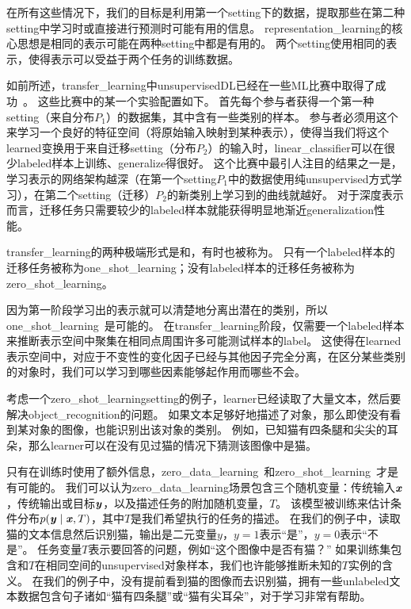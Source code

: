 在所有这些情况下，我们的目标是利用第一个\gls{setting}下的数据，提取那些在第二种\gls{setting}中学习时或直接进行预测时可能有用的信息。
\gls{representation_learning}的核心思想是相同的表示可能在两种\gls{setting}中都是有用的。
两个\gls{setting}使用相同的表示，使得表示可以受益于两个任务的训练数据。

如前所述，\gls{transfer_learning}中\gls{unsupervised}\gls{DL}已经在一些\gls{ML}比赛中取得了成功~\citep{UTLC+LISA-2011-small,goodfellow+all-NIPS2011}。
这些比赛中的某一个实验配置如下。
首先每个参与者获得一个第一种\gls{setting}（来自分布$P_1$）的数据集，其中含有一些类别的样本。
参与者必须用这个来学习一个良好的特征空间（将原始输入映射到某种表示），使得当我们将这个\gls{learned}变换用于来自迁移\gls{setting}（分布$P_2$）的输入时，\gls{linear_classifier}可以在很少\gls{labeled}样本上训练、\gls{generalize}得很好。
这个比赛中最引人注目的结果之一是，学习表示的网络架构越深（在第一个\gls{setting}$P_1$中的数据使用纯\gls{unsupervised}方式学习），在第二个\gls{setting}（迁移）$P_2$的新类别上学习到的曲线就越好。
对于深度表示而言，迁移任务只需要较少的\gls{labeled}样本就能获得明显地渐近\gls{generalization}性能。


\gls{transfer_learning}的两种极端形式是和，有时也被称为。
只有一个\gls{labeled}样本的迁移任务被称为\gls{one_shot_learning}；没有\gls{labeled}样本的迁移任务被称为\gls{zero_shot_learning}。

因为第一阶段学习出的表示就可以清楚地分离出潜在的类别，所以\gls{one_shot_learning}~\citep{Fei-Fei+al-2006}是可能的。
在\gls{transfer_learning}阶段，仅需要一个\gls{labeled}样本来推断表示空间中聚集在相同点周围许多可能测试样本的\gls{label}。
这使得在\gls{learned}表示空间中，对应于不变性的变化因子已经与其他因子完全分离，在区分某些类别的对象时，我们可以学习到哪些因素能够起作用而哪些不会。


考虑一个\gls{zero_shot_learning}\gls{setting}的例子，\gls{learner}已经读取了大量文本，然后要解决\gls{object_recognition}的问题。
如果文本足够好地描述了对象，那么即使没有看到某对象的图像，也能识别出该对象的类别。
例如，已知猫有四条腿和尖尖的耳朵，那么\gls{learner}可以在没有见过猫的情况下猜测该图像中是猫。


只有在训练时使用了额外信息，\gls{zero_data_learning}~\citep{Larochelle2008}和\gls{zero_shot_learning}~\citep{Palatucci2009,Socher-2013}才是有可能的。
我们可以认为\gls{zero_data_learning}场景包含三个随机变量：传统输入$\boldsymbol{\mathit{x}}$，传统输出或目标$\boldsymbol{\mathit{y}}$，以及描述任务的附加随机变量，$T$。
该模型被训练来估计条件分布$p(\boldsymbol{\mathit{y}} \mid \boldsymbol{\mathit{x}}, T)$，其中$T$是我们希望执行的任务的描述。
在我们的例子中，读取猫的文本信息然后识别猫，输出是二元变量$y$，$y=1$表示``是''，$y=0$表示``不是''。
任务变量$T$表示要回答的问题，例如``这个图像中是否有猫？''
如果训练集包含和$T$在相同空间的\gls{unsupervised}对象样本，我们也许能够推断未知的$T$实例的含义。
在我们的例子中，没有提前看到猫的图像而去识别猫，拥有一些\gls{unlabeled}文本数据包含句子诸如``猫有四条腿''或``猫有尖耳朵''，对于学习非常有帮助。


